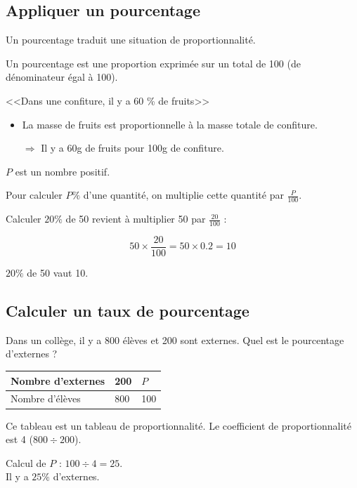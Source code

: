 \documentclass[12pt,a4paper]{article}
\begin{document}
\subsection{Appliquer un pourcentage}

\begin{mydef}
	Un pourcentage traduit une situation de proportionnalité. 

	Un pourcentage est une proportion exprimée sur un total de 100 (de dénominateur égal à 100).
	
\end{mydef}

\begin{myex}
	<<Dans une confiture, il y a 60 \% de fruits>>
	\begin{itemize}
		\item La masse de fruits est proportionnelle à la masse totale de confiture.
		\item[$\Rightarrow$] Il y a 60g de fruits pour 100g de confiture.
	\end{itemize}
\end{myex}


\begin{myprop}
	$P$ est un nombre positif.
	
	Pour calculer $P\% $ d'une quantité, on multiplie cette quantité par $\frac{P}{100}$.
\end{myprop}


\begin{myex}
	Calculer $20 \% $ de 50 revient à multiplier 50 par $\frac{20}{100}$ :
	
	\begin{equation*}
		50 \times \dfrac{20}{100} = 50 \times \num{0.2} = 10
	\end{equation*}
	
	
	$20 \% $ de 50  vaut 10.
\end{myex}

\subsection{Calculer un taux de pourcentage}


\begin{myex}
	Dans un collège, il y a 800 élèves et 200 sont externes. Quel est le pourcentage d'externes ?\\
	
	
		\begin{tabular}{|l|l|l|}
			\hline
			Nombre d'externes & 200 & $P$ \\ \hline
			Nombre d'élèves   & 800 & 100 \\ \hline
		\end{tabular}
	
	\vspace*{0.5cm}

	
	Ce tableau est un tableau de proportionnalité. Le coefficient de proportionnalité est 4 ($800 \div 200$).
	
	Calcul de $P$ : $100 \div 4 = 25$.\\
	
	 Il y a $25 \%$ d'externes.
\end{myex}
\end{document}
